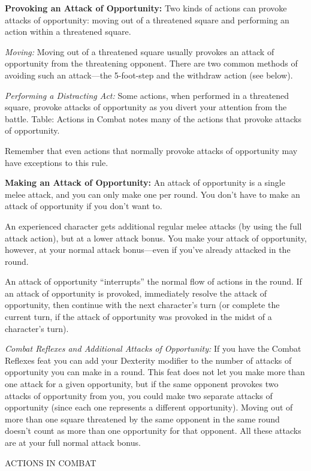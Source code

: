 \documentclass{article}
\begin{document}
\textbf{Provoking an Attack of Opportunity: }Two kinds of actions can provoke attacks 
of opportunity: moving out of a threatened square and performing an action within 
a threatened square.

\textit{Moving: }Moving out of a threatened square usually provokes an attack of 
opportunity from the threatening opponent. There are two common methods of avoiding 
such an attack---the 5-foot-step and the withdraw action (see below).

\textit{Performing a Distracting Act: }Some actions, when performed in a threatened 
square, provoke attacks of opportunity as you divert your attention from the battle. 
Table: Actions in Combat notes many of the actions that provoke attacks of opportunity.

Remember that even actions that normally provoke attacks of opportunity may have 
exceptions to this rule.

\textbf{Making an Attack of Opportunity:} An attack of opportunity is a single 
melee attack, and you can only make one per round. You don't have to make an attack 
of opportunity if you don't want to.

An experienced character gets additional regular melee attacks (by using the full 
attack action), but at a lower attack bonus. You make your attack of opportunity, 
however, at your normal attack bonus---even if you've already attacked in the round.

An attack of opportunity ``interrupts'' the normal flow of actions in the round. 
If an attack of opportunity is provoked, immediately resolve the attack of opportunity, 
then continue with the next character's turn (or complete the current turn, if 
the attack of opportunity was provoked in the midst of a character's turn).

\textit{Combat Reflexes and Additional Attacks of Opportunity: }If you have the 
Combat Reflexes feat you can add your Dexterity modifier to the number of attacks 
of opportunity you can make in a round. This feat does not let you make more than 
one attack for a given opportunity, but if the same opponent provokes two attacks 
of opportunity from you, you could make two separate attacks of opportunity (since 
each one represents a different opportunity). Moving out of more than one square 
threatened by the same opponent in the same round doesn't count as more than one 
opportunity for that opponent. All these attacks are at your full normal attack 
bonus.

\vspace{12pt}
{\LARGE{}ACTIONS IN COMBAT}
\end{document}
